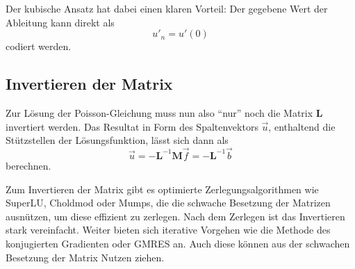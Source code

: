 Der kubische Ansatz hat dabei einen klaren Vorteil: 
Der gegebene Wert der Ableitung kann direkt als 
\begin{equation}
    u'_n = u'(0)
\end{equation}
codiert werden.


\subsection{Invertieren der Matrix\label{fem:1d:matrix_invertieren}}
Zur Lösung der Poisson-Gleichung muss nun also ``nur'' noch die Matrix $\mathbf{L}$ invertiert werden.
Das Resultat in Form des Spaltenvektors $\vec{u}$, enthaltend die Stützstellen der Lösungsfunktion, lässt sich dann als
\begin{equation}
    \vec{u} = - \mathbf{L}^{-1}\mathbf{M}\vec{f} = - \mathbf{L}^{-1}\vec{b}
\end{equation}
berechnen.

Zum Invertieren der Matrix gibt es optimierte Zerlegungsalgorithmen wie SuperLU, Choldmod oder Mumps, die die schwache Besetzung der Matrizen ausnützen, um diese effizient zu zerlegen.
Nach dem Zerlegen ist das Invertieren stark vereinfacht.
Weiter bieten sich iterative Vorgehen wie die Methode des konjugierten Gradienten oder GMRES an.
Auch diese können aus der schwachen Besetzung der Matrix Nutzen ziehen.
